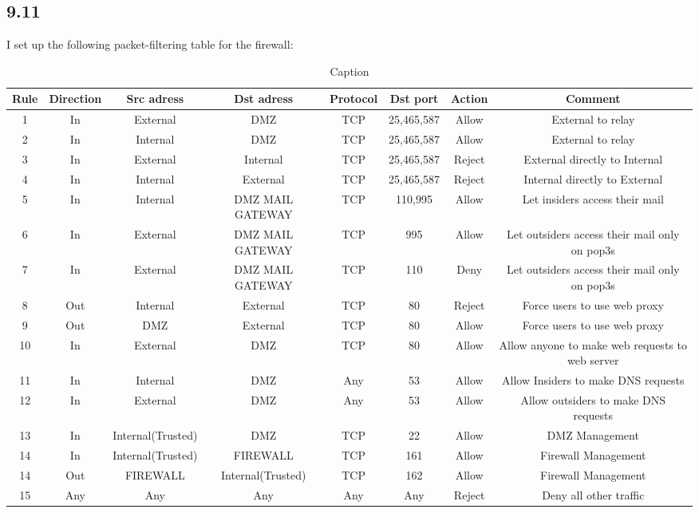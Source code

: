 \documentclass{article}
\begin{document}
\subsection{9.11}
I set up the following packet-filtering table for the firewall:\\
\begin{table}[!htb]
    \begin{adjustwidth}{-1.8in}{-1in}
    \centering
    \small
\begin{tabular}{|c|c|c|c|c|c|c|c|}
Rule & Direction & Src adress & Dst adress & Protocol & Dst port & Action & Comment\\\hline
1 & In & External & DMZ & TCP & 25,465,587 & Allow & External to relay\\
2 & In & Internal & DMZ & TCP & 25,465,587 & Allow & External to relay\\
3 & In & External & Internal & TCP & 25,465,587 & Reject & External directly to Internal\\
4 & In & Internal & External & TCP & 25,465,587 & Reject & Internal directly to External\\
5 & In & Internal & DMZ MAIL GATEWAY & TCP & 110,995 & Allow & Let insiders access their mail\\
6 & In & External & DMZ MAIL GATEWAY & TCP & 995 & Allow & Let outsiders access their mail only on pop3s\\
7 & In & External & DMZ MAIL GATEWAY & TCP & 110 & Deny & Let outsiders access their mail only on pop3s\\
8 & Out & Internal & External & TCP & 80 & Reject & Force users to use web proxy \\
9 & Out & DMZ & External & TCP & 80 & Allow & Force users to use web proxy \\
10 & In & External & DMZ & TCP & 80 & Allow & Allow anyone to make web requests to web server\\
11 & In & Internal & DMZ & Any & 53 & Allow & Allow Insiders to make DNS requests\\
12 & In & External & DMZ & Any & 53 & Allow & Allow outsiders to make DNS requests\\
13 & In & Internal(Trusted) & DMZ & TCP & 22 & Allow & DMZ Management\\
14 & In & Internal(Trusted) & FIREWALL & TCP & 161 & Allow & Firewall Management\\
14 & Out & FIREWALL & Internal(Trusted) & TCP & 162 & Allow & Firewall Management\\
15 & Any & Any & Any & Any & Any & Reject & Deny all other traffic\\
\end{tabular}
    \caption{Caption}
    \label{tab:my_label}
    \end{adjustwidth}
\end{table}
\end{document}
